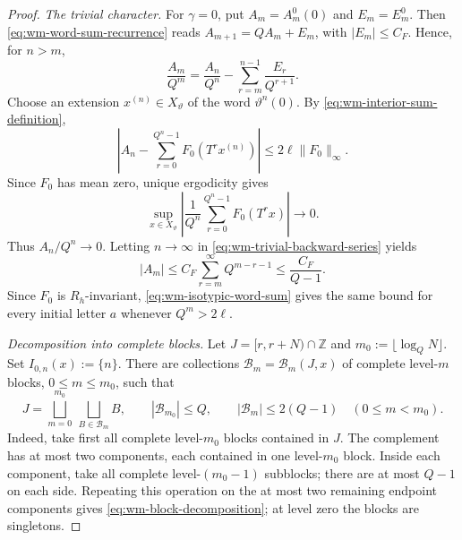 \documentclass[11pt,reqno,a4paper]{amsart}
\numberwithin{equation}{section}
\theoremstyle{compact}
\theoremstyle{definition}
\theoremstyle{definition}
\begin{document}
\begin{proof}
\smallskip\noindent\emph{The trivial character.}
For $\gamma=0$, put $A_m=A_m^0(0)$ and $E_m=E_m^0$.  Then
\eqref{eq:wm-word-sum-recurrence} reads
$A_{m+1}=QA_m+E_m$, with $|E_m|\leq C_F$.  Hence, for $n>m$,
\begin{equation}\label{eq:wm-trivial-backward-series}
  \frac{A_m}{Q^m}
  =\frac{A_n}{Q^n}
   -\sum_{r=m}^{n-1}\frac{E_r}{Q^{r+1}}.
\end{equation}
Choose an extension $x^{(n)}\in X_\vartheta$ of the word
$\vartheta^n(0)$.  By \eqref{eq:wm-interior-sum-definition},
\[
  \left|
    A_n-\sum_{r=0}^{Q^n-1}F_0(T^rx^{(n)})
  \right|
  \leq2\ell\|F_0\|_\infty.
\]
Since $F_0$ has mean zero, unique ergodicity gives
\[
  \sup_{x\in X_\vartheta}
  \left|\frac1{Q^n}\sum_{r=0}^{Q^n-1}F_0(T^rx)\right|\longrightarrow0.
\]
Thus $A_n/Q^n\to0$.  Letting $n\to\infty$ in
\eqref{eq:wm-trivial-backward-series} yields
\[
  |A_m|
  \leq C_F\sum_{r=m}^\infty Q^{m-r-1}
  \leq \frac{C_F}{Q-1}.
\]
Since $F_0$ is $R_h$-invariant,
\eqref{eq:wm-isotypic-word-sum} gives the same bound for every initial
letter $a$ whenever $Q^m>2\ell$.

\smallskip\noindent\emph{Decomposition into complete blocks.}
Let $J=[r,r+N)\cap\mathbb Z$ and
$m_0:=\lfloor\log_QN\rfloor$.  Set $I_{0,n}(x):=\{n\}$.  There are
collections $\mathcal B_m=\mathcal B_m(J,x)$ of complete level-$m$ blocks,
$0\leq m\leq m_0$, such that
\begin{equation}\label{eq:wm-block-decomposition}
  J=\bigsqcup_{m=0}^{m_0}\ \bigsqcup_{B\in\mathcal B_m}B,
  \qquad
  |\mathcal B_{m_0}|\leq Q,
  \qquad
  |\mathcal B_m|\leq2(Q-1)\quad(0\leq m<m_0).
\end{equation}
Indeed, take first all complete level-$m_0$ blocks contained in $J$.  The
complement has at most two components, each contained in one level-$m_0$
block.  Inside each component, take all complete level-$(m_0-1)$ subblocks;
there are at most $Q-1$ on each side.  Repeating this operation on the at
most two remaining endpoint components gives
\eqref{eq:wm-block-decomposition}; at level zero the blocks are singletons.


\end{proof}
\end{document}
